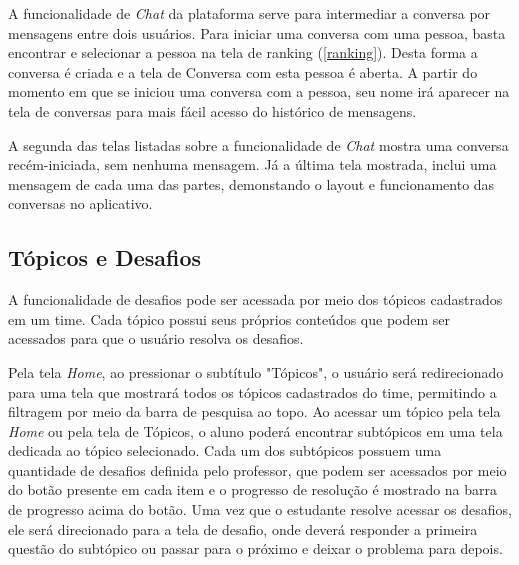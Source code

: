 A funcionalidade de \textit{Chat} da plataforma serve para intermediar a conversa por mensagens entre dois usuários. Para iniciar uma conversa com uma pessoa, basta encontrar e selecionar a pessoa na tela de ranking (\ref{ranking}). Desta forma a conversa é criada e a tela de Conversa com esta pessoa é aberta. A partir do momento em que se iniciou uma conversa com a pessoa, seu nome irá aparecer na tela de conversas para mais fácil acesso do histórico de mensagens.


A segunda das telas listadas sobre a funcionalidade de \textit{Chat} mostra uma conversa recém-iniciada, sem nenhuma mensagem. Já a última tela mostrada, inclui uma mensagem de cada uma das partes, demonstando o layout e funcionamento das conversas no aplicativo.

\subsection{Tópicos e Desafios}
\label{topics_challenges}

A funcionalidade de desafios pode ser acessada por meio dos tópicos cadastrados em um time. Cada tópico possui seus próprios conteúdos que podem ser acessados para que o usuário resolva os desafios.


Pela tela \textit{Home}, ao pressionar o subtítulo "Tópicos", o usuário será redirecionado para uma tela que mostrará todos os tópicos cadastrados do time, permitindo a filtragem por meio da barra de pesquisa ao topo. Ao acessar um tópico pela tela \textit{Home} ou pela tela de Tópicos, o aluno poderá encontrar subtópicos em uma tela dedicada ao tópico selecionado. Cada um dos subtópicos possuem uma quantidade de desafios definida pelo professor, que podem ser acessados por meio do botão presente em cada item e o progresso de resolução é mostrado na barra de progresso acima do botão. Uma vez que o estudante resolve acessar os desafios, ele será direcionado para a tela de desafio, onde deverá responder a primeira questão do subtópico ou passar para o próximo e deixar o problema para depois.


